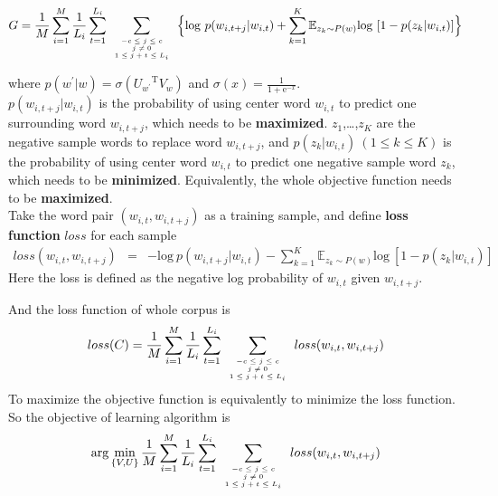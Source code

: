 \begin{equation}
\begin{split}
G = \frac{1}{M}\sum_{i=1}^M\frac{1}{L_i}\sum_{t=1}^{L_i}\sum\limits_{\mbox{\tiny$\begin{array}{c}-c\leq j \leq c\\ j\neq 0\\ 1\leq j+t\leq L_i\end{array}$}}\Big \{\mathrm{log}\ p(w_{i,t+j}|w_{i,t}) 
+\sum\limits_{k=1}^K\mathbb{E}_{z_k\sim P(w)}\mathrm{log}\ [1-p(z_k|w_{i,t}) ] \Big \}
\end{split}
\end{equation} 

where $p(w^\prime|w) = \sigma({U_{w^\prime}}^{\mathrm{T}}V_w)$
 and $\sigma(x) = \frac{1}{1+\mathrm{e}^{-x}}$.\\
 
 $p(w_{i,t+j}|w_{i,t})$ is the probability of using center word $w_{i,t}$ to predict one surrounding word $w_{i,t+j}$, which needs to be \textbf{maximized}.
$z_1$,\ldots,$z_K$ are the negative sample words to replace word $w_{i,t+j}$, and $p(z_k|w_{i,t})\ (1\leq k\leq K)$ is the probability of using center word $w_{i,t}$ to predict one negative sample word $z_k$, which needs to be \textbf{minimized}. Equivalently, the whole objective function needs to be \textbf{maximized}. \\ 

Take the word pair $(w_{i,t},w_{i,t+j})$ as a training sample, and define \textbf{loss function} $loss$ for each sample 
\begin{eqnarray}
loss(w_{i,t},w_{i,t+j})
 &=& -\mathrm{log}\ p(w_{i,t+j}|w_{i,t})-\sum\limits_{k=1}^K\mathbb{E}_{z_k\sim P(w)}\mathrm{log}\ [1-p(z_k|w_{i,t})] 
\end{eqnarray}
Here the loss is defined as the negative log probability of $w_{i,t}$ given $w_{i,t+j}$. 

And the loss function of whole corpus is $$loss(C)=\frac{1}{M}\sum_{i=1}^M\frac{1}{L_i}\sum_{t=1}^{L_i}\sum\limits_{\mbox{\tiny$\begin{array}{c}-c\leq j \leq c\\ j\neq 0\\ 1\leq j+t\leq L_i\end{array}$}}loss(w_{i,t},w_{i,t+j})$$
To maximize the objective function is equivalently to minimize the loss function. So the objective of learning algorithm is 
$$\arg\min_{\{V,U\}} \frac{1}{M}\sum_{i=1}^M\frac{1}{L_i}\sum_{t=1}^{L_i}\sum\limits_{\mbox{\tiny$\begin{array}{c}-c\leq j \leq c\\ j\neq 0\\ 1\leq j+t\leq L_i\end{array}$}}loss(w_{i,t},w_{i,t+j})$$ 

